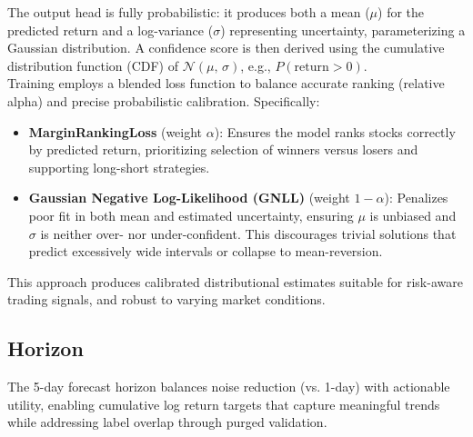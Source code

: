 \documentclass[twoside,final]{hcmut-report}
\begin{document}
The output head is fully probabilistic: it produces both a mean ($\mu$) for the predicted return and a log-variance ($\sigma$) representing uncertainty, parameterizing a Gaussian distribution. A confidence score is then derived using the cumulative distribution function (CDF) of $\mathcal{N}(\mu,\,\sigma)$, e.g., $P(\text{return} > 0)$.\\

Training employs a blended loss function to balance accurate ranking (relative alpha) and precise probabilistic calibration. Specifically:
\begin{itemize}
  \item \textbf{MarginRankingLoss} (weight $\alpha$): Ensures the model ranks stocks correctly by predicted return, prioritizing selection of winners versus losers and supporting long-short strategies.
  \item \textbf{Gaussian Negative Log-Likelihood (GNLL)} (weight $1-\alpha$): Penalizes poor fit in both mean and estimated uncertainty, ensuring $\mu$ is unbiased and $\sigma$ is neither over- nor under-confident. This discourages trivial solutions that predict excessively wide intervals or collapse to mean-reversion.
\end{itemize}
This approach produces calibrated distributional estimates suitable for risk-aware trading signals, and robust to varying market conditions.

\subsection{Horizon}
The 5-day forecast horizon balances noise reduction (vs. 1-day) with actionable utility, enabling cumulative log return targets that capture meaningful trends while addressing label overlap through purged validation.
\end{document}
